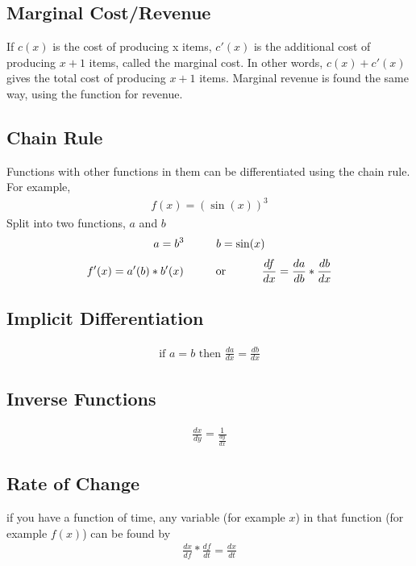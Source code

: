 \documentclass{article}
\newcommand\tab[1][1cm]{\hspace*{#1}}
\newcommand\dd[2]{\frac{d{#1}}{d{#2}}}
\begin{document}
    \subsection{Marginal Cost/Revenue}
        If \(c(x)\) is the cost of producing x items, \(c'(x)\) is the  additional cost of producing \(x+1\) items, called the marginal cost. In other words, \(c(x) + c'(x)\) gives the total cost of producing \(x+1\) items. Marginal revenue is found the same way, using the function for revenue.
    \subsection{Chain Rule}
        Functions with other functions in them can be differentiated using the chain rule. For example,
        \begin{gather*}
            f(x) = (\sin(x))^3
        \end{gather*}
        Split into two functions, \(a\) and \(b\)
        \begin{gather*}
            a = b^3 \text{\tab} b = \sin(x)
        \end{gather*}
        \begin{gather*}
            f'(x) = a'(b) * b'(x) \text{\tab or \tab} \dd{f}{x} = \dd{a}{b}*\dd{b}{x}
        \end{gather*}
    \subsection{Implicit Differentiation}
        \begin{gather*}
            \text{if } a = b \text{ then } \dd{a}{x} = \dd{b}{x}
        \end{gather*}
    \subsection{Inverse Functions}
        \begin{gather*}
            \dd{x}{y} = \frac{1}{\dd{y}{x}}
        \end{gather*}
    \subsection{Rate of Change}
        if you have a function of time, any variable (for example \(x\)) in that function (for example \(f(x)\)) can be found by
        \begin{gather*}
            \dd{x}{f} * \dd{f}{t} = \dd{x}{t}
        \end{gather*}
\end{document}
